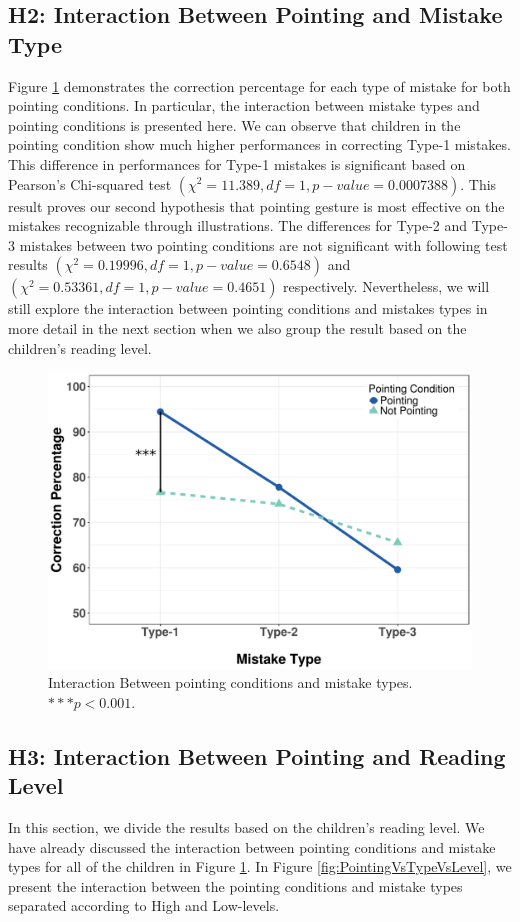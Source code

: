 \documentclass{sigchi}
\begin{document}
\subsection{H2: Interaction Between Pointing and Mistake Type}
Figure \ref{fig:PointingVsType} demonstrates the correction percentage for each type of mistake for both pointing conditions. 
In particular, the interaction between mistake types and pointing conditions is presented here. 
We can observe that children in the pointing condition show much higher performances in correcting Type-1 mistakes.
This difference in performances for Type-1 mistakes is significant based on Pearson's Chi-squared test $(\chi^2 = 11.389, df = 1, p-value = 0.0007388)$.
This result proves our second hypothesis that pointing gesture is most effective on the mistakes recognizable through illustrations.
The differences for Type-2 and Type-3 mistakes between two pointing conditions are not significant with following test results $(\chi^2 = 0.19996, df = 1, p-value = 0.6548)$ and $(\chi^2 = 0.53361, df = 1, p-value = 0.4651)$ respectively.
Nevertheless, we will still explore the interaction between pointing conditions and mistakes types in more detail in the next section when we also group the result based on the children's reading level.



\begin{figure}[t]
  \centering
  \includegraphics[width=1\linewidth]{figures/cVmVp2.pdf}
  \caption{Interaction Between pointing conditions and mistake types. $***p<0.001$.}
  \label{fig:PointingVsType}
\end{figure}   

\subsection{H3: Interaction Between Pointing and Reading Level}
In this section, we divide the results based on the children's reading level.
We have already discussed the interaction between pointing conditions and mistake types for all of the children in Figure \ref{fig:PointingVsType}.
In Figure \ref{fig:PointingVsTypeVsLevel}, we present the interaction between the pointing conditions and mistake types separated according to High and Low-levels. 
\end{document}
